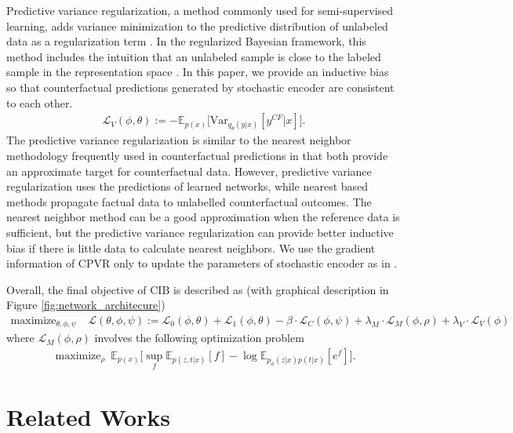 \documentclass{article}
\DeclareMathOperator*{\maximize}{maximize}
\begin{document}
Predictive variance regularization, a method commonly used for semi-supervised learning, adds variance minimization to the predictive distribution of unlabeled data as a regularization term \cite{jean2018semi}. In the regularized Bayesian framework, this method includes the intuition that an unlabeled sample is close to the labeled sample in the representation space \cite{Alaa17, jean2018semi}. In this paper, we provide an inductive bias so that counterfactual predictions generated by stochastic encoder are consistent to each other.
    \begin{align*}
        \mathcal{L}_{V}(\phi, \theta) {:=}  -\mathbb{E}_{p(x)}\big[ \text{Var}_{q_{\theta}(y|x)}[y^{CF}|x] \big].
    \end{align*}
    The predictive variance regularization is similar to the nearest neighbor methodology frequently used in counterfactual predictions \cite{johansson16, chang2017informative, li2017matching} in that both  provide an approximate target for counterfactual data. However, predictive variance regularization uses the predictions of learned networks, while nearest based methods propagate factual data to unlabelled counterfactual outcomes. The nearest neighbor method can be a good approximation when the reference data is sufficient, but the predictive variance regularization can provide better inductive bias if there is little data to calculate nearest neighbors. We use the gradient information of CPVR only to update the parameters of stochastic encoder as in \cite{Alaa17, jean2018semi}.
    
    Overall, the final objective of CIB is described as (with graphical description in Figure \ref{fig:network_architecure})
    \begin{align*}
        \maximize_{\theta, \phi, \psi} & \ \mathcal{L}(\theta, \phi, \psi) {:=}  \mathcal{L}_{0}(\phi, \theta) + \mathcal{L}_{1}(\phi, \theta) - \beta \cdot \mathcal{L}_{C}(\phi, \psi) + \lambda_{M}\cdot \mathcal{L}_{M}(\phi, \rho) + \lambda_{V}\cdot\mathcal{L}_{V}(\phi)
    \end{align*}
    where $\mathcal{L}_{M}(\phi, \rho)$ involves the following optimization problem
    \begin{align*}
        \maximize_{\rho}  \ \mathbb{E}_{p(x)}\Big[\sup_{f} \mathbb{E}_{p(z,t|x)}[f] - \log \mathbb{E}_{p_{\phi}(z|x)p(t|x)}[e^{f}]\Big].
    \end{align*}

\section{Related Works}
\end{document}
